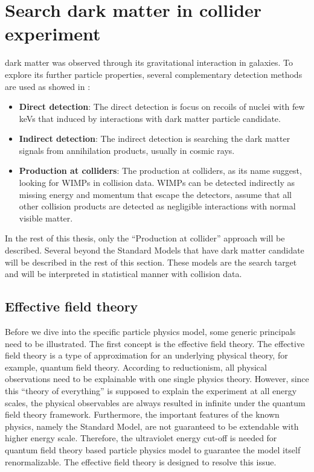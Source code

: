 \section{Search dark matter in collider experiment}
\label{sec:dms3}
\par dark matter was observed through its gravitational interaction in galaxies. To explore its further particle properties, several complementary detection methods are used as showed in \cite{Undagoitia:2015gya}: 
\begin{itemize}
  \item \textbf{Direct detection}: The direct detection is focus on recoils of nuclei with few keVs that induced by interactions with dark matter particle candidate.
  \item \textbf{Indirect detection}: The indirect detection is searching the dark matter signals from annihilation products, usually in cosmic rays.
  \item \textbf{Production at colliders}: The production at colliders, as its name suggest, looking for WIMPs in collision data. WIMPs can be detected indirectly as missing energy and momentum that escape the detectors, assume that all other collision products are detected as negligible interactions with normal visible matter.
\end{itemize}

\par In the rest of this thesis, only the ``Production at collider'' approach will be described. Several beyond the Standard Models that have dark matter candidate will be described in the rest of this section. These models are the search target and will be interpreted in statistical manner with collision data.

\subsection{Effective field theory}
Before we dive into the specific particle physics model, some generic principals need to be illustrated. The first concept is the effective field theory. The effective field theory is a type of approximation for an underlying physical theory, for example, quantum field theory. According to reductionism, all physical observations need to be explainable with one single physics theory. However, since this “theory of everything” is supposed to explain the experiment at all energy scales, the physical observables are always resulted in infinite under the quantum field theory framework. Furthermore, the important features of the known physics, namely the Standard Model, are not guaranteed to be extendable with higher energy scale. Therefore, the ultraviolet energy cut-off is needed for quantum field theory based particle physics model to guarantee the model itself renormalizable. The effective field theory\cite{Pich:1998xt} is designed to resolve this issue.

